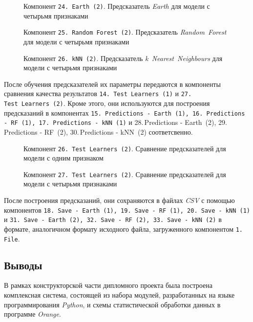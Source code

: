 \begin{figure}[tbp]
    \caption{Компонент \texttt{24.\,Earth~(2)}. Предсказатель \textit{Earth} для модели с четырьмя признаками}
    \label{img:24-Earth-2}
\end{figure}

\begin{figure}[tbp]
    \center{\texttt{[image: 25-RF-2]}}
    \caption{Компонент \texttt{25.\,Random~Forest~(2)}. Предсказатель \textit{Random~Forest} для модели с четырьмя признаками}
    \label{img:25-RF-2}
\end{figure}

\begin{figure}[tbp]
    \caption{Компонент \texttt{26.\,kNN~(2)}. Предсказатель \textit{k~Nearest~Neighbours} для модели с четырьмя признаками}
    \label{img:26-kNN-2}
\end{figure}

После обучения предсказателей их параметры передаются в компоненты сравнения качества результатов \texttt{14.\,Test~Learners~(1)} и \texttt{27.\,Test~Learners~(2)}. Кроме этого, они используются для построения предсказаний в компонентах \texttt{15.\,Predictions - Earth~(1), 16.\,Predictions - RF~(1), 17.\,Predictions - kNN~(1)} и {28.\,Predictions - Earth~(2), 29.\,Predictions - RF~(2), 30.\,Predictions - kNN~(2)} соответсвенно.

\begin{figure}[tbp]
    \caption{Компонент \texttt{26.\,Test~Learners~(2)}. Сравнение предсказателей для модели с одним признаком}
    \label{img:14-Test-Learners-1}
\end{figure}

\begin{figure}[tbp]
    \caption{Компонент \texttt{27.\,Test~Learners~(2)}. Сравнение предсказателей для модели с четырьмя признаками}
    \label{img:27-Test-Learners-2}
\end{figure}

После построения предсказаний, они сохраняются в файлах \textit{CSV} с помощью компонентов \texttt{18.\,Save - Earth~(1), 19.\,Save - RF~(1), 20.\,Save - kNN~(1)} и \texttt{31.\,Save - Earth~(2), 32.\,Save - RF~(2), 33.\,Save - kNN~(2)} в формате, аналогичном формату исходного файла, загруженного компонентом \texttt{1.\,File}.


\subsection{Выводы}
В рамках конструкторской части дипломного проекта была построена комплексная система, состоящей из набора модулей, разработанных на языке программирования \textit{Python}, и схемы статистической обработки данных в программе \textit{Orange}.